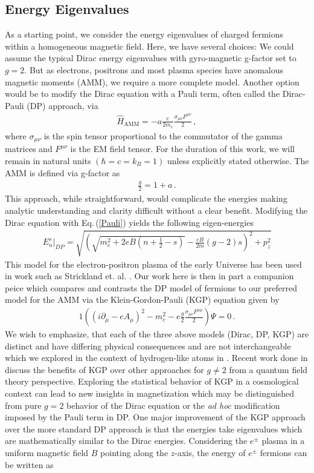 \documentclass[universe,article,submit,moreauthors,pdftex,a4paper]{Definitions/mdpi}
\newcommand{\req}[1]{Eq.\,(\ref{#1})}
\begin{document}
\subsection{Energy Eigenvalues}\label{sec:energy}
\noindent As a starting point, we consider the energy eigenvalues of charged fermions within a homogeneous magnetic field. Here, we have several choices: We could assume the typical Dirac energy eigenvalues with gyro-magnetic g-factor set to $g=2$. But as electrons, positrons and most plasma species have anomalous magnetic moments (AMM), we require a more complete model. Another option would be to modify the Dirac equation with a Pauli term, often called the Dirac-Pauli (DP) approach, via
\begin{align}
  \label{Pauli} \hat{H}_{\mathrm{AMM}} = -a\frac{e}{2m_{e}}\frac{\sigma_{\mu\nu}F^{\mu\nu}}{2}\,,
\end{align}
where $\sigma_{\mu\nu}$ is the spin tensor proportional to the commutator of the gamma matrices and $F^{\mu\nu}$ is the EM field tensor. For the duration of this work, we will remain in natural units $(\hbar=c=k_{B}=1)$ unless explicitly stated otherwise. The AMM is defined via g-factor as
\begin{align}
  \label{AMM} \frac{g}{2}=1+a\,.
\end{align}
This approach, while straightforward, would complicate the energies making analytic understanding and clarity difficult without a clear benefit. Modifying the Dirac equation with \req{Pauli} yields the following eigen-energies
\begin{align}
  \label{DPEnergy} E_{n}^{s}\vert_{DP}=\sqrt{\left(\sqrt{m_{e}^{2}+2eB\left(n+\frac{1}{2}-s\right)}-\frac{eB}{2m}(g-2)s\right)^{2}+p_{z}^{2}}
\end{align}
This model for the electron-positron plasma of the early Universe has been used in work such as Strickland et. al. \cite{Strickland:2012vu}. Our work here is then in part a companion peice which compares and contrasts the DP model of fermions to our preferred model for the AMM via the Klein-Gordon-Pauli (KGP) equation given by
\begin{alignat}{1}
  \label{KGP} \left(\left(i\partial_{\mu}-eA_{\mu}\right)^{2}-m_{e}^{2}-e\frac{g}{2}\frac{\sigma_{\mu\nu}F^{\mu\mu}}{2}\right)\Psi=0\,.
\end{alignat}
We wish to emphasize, that each of the three above models (Dirac, DP, KGP) are distinct and have differing physical consequences and are not interchangeable which we explored in the context of hydrogen-like atoms in \cite{Steinmetz:2018ryf}. Recent work done in \cite{rafelski2023study} discuss the benefits of KGP over other approaches for $g\neq2$ from a quantum field theory perspective. Exploring the statistical behavior of KGP in a cosmological context can lead to new insights in magnetization which may be distinguished from pure $g=2$ behavior of the Dirac equation or the \emph{ad hoc} modification imposed by the Pauli term in DP. One major improvement of the KGP approach over the more standard DP approach is that the energies take eigenvalues which are mathematically similar to the Dirac energies. Considering the $e^\pm$ plasma in a uniform magnetic field $B$ pointing along the $z$-axis, the energy of $e^\pm$ fermions can be written as
\end{document}
